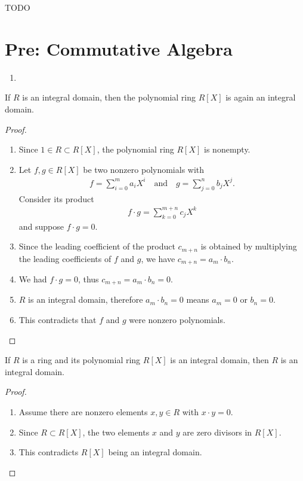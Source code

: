 TODO

\part{Pre: Commutative Algebra}

\begin{enumerate}
    \item 
\end{enumerate}
\begin{proposition}
    If \(R\) is an integral domain, then the polynomial ring \(R[X]\) is again an integral domain.
\end{proposition}
\begin{proof}
    \begin{enumerate}
        \item Since \(1 \in R \subset R[X]\), the polynomial ring \(R[X]\) is nonempty.
        \item Let \(f, g \in R[X]\) be two nonzero polynomials with
        \begin{align*}
            f = \sum_{i = 0}^{m} a_i X^i \quad \text{and} \quad g = \sum_{j = 0}^{n} b_j X^j \text{.}
        \end{align*}
        Consider its product
        \begin{align*}
            f \cdot g = \sum_{k = 0}^{m + n} c_j X^k
        \end{align*}
        and suppose \(f \cdot g = 0\).
        \item Since the leading coefficient of the product \(c_{m+n}\) is obtained by multiplying the leading coefficients of \(f\) and \(g\), we have \(c_{m+n} = a_m \cdot b_n\).
        \item We had \(f \cdot g = 0\), thus \(c_{m+n} = a_m \cdot b_n = 0\).
        \item \(R\) is an integral domain, therefore \(a_m \cdot b_n = 0\) means \(a_m = 0\) or \(b_n = 0\).
        \item This contradicts that \(f\) and \(g\) were nonzero polynomials.
    \end{enumerate}
\end{proof}

\begin{proposition}
    If \(R\) is a ring and its polynomial ring \(R[X]\) is an integral domain, then \(R\) is an integral domain.
\end{proposition}
\begin{proof}
    \begin{enumerate}
        \item Assume there are nonzero elements \(x, y \in R\) with \(x \cdot y = 0\).
        \item Since \(R \subset R[X]\), the two elements \(x\) and \(y\) are zero divisors in \(R[X]\).
        \item This contradicts \(R[X]\) being an integral domain.
    \end{enumerate}
\end{proof}

